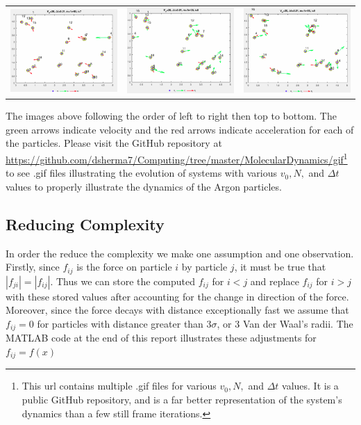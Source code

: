\documentclass[11.5pt]{article}
\newcounter{graphics}
\begin{document}
\begin{center}
\begin{tabular}{ccc}
\includegraphics[width = 2in]{7.png}&\includegraphics[width = 2in]{8.png}&\includegraphics[width = 2in]{9.png}\\
\end{tabular}
\end{center}
The images above following the order of left to right then top to bottom. The green arrows indicate velocity and the red arrows indicate acceleration for each of the particles. Please visit the GitHub repository at \hyperlink{https://github.com/dsherma7/Computing/tree/master/MolecularDynamics/gif}{https://github.com/dsherma7/Computing/tree/master/MolecularDynamics/gif}\footnote{This url contains multiple .gif files for various $v_0, N,$ and $\Delta t$ values. It is a public GitHub repository, and is a far better representation of the system's dynamics than a few still frame iterations.} to see .gif files illustrating the evolution of systems with various $v_0, N,$ and $\Delta t$ values to properly illustrate the dynamics of the Argon particles.

\subsection{Reducing Complexity}
In order the reduce the complexity we make one assumption and one observation. Firstly, since $f_{ij}$ is the force on particle $i$ by particle $j$, it must be true that $|f_{ji}| = |f_{ij}|$. Thus we can store the computed $f_{ij}$ for $i<j$ and replace $f_{ij}$ for $i > j$ with these stored values after accounting for the change in direction of the force.  Moreover, since the force decays with distance exceptionally fast we assume that $f_{ij} = 0$ for particles with distance greater than $3\sigma$, or 3 Van der Waal's radii. The MATLAB code at the end of this report illustrates these adjustments for $f_{ij}=f(x)$
\vfill
\end{document}
